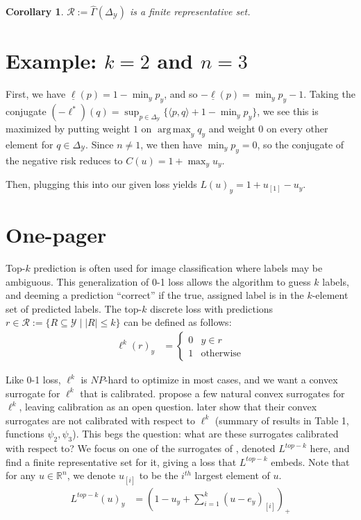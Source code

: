 \documentclass[12pt]{article}
\newcommand{\reals}{\mathbb{R}}
\newcommand{\simplex}{\Delta_\Y}
\newcommand{\R}{\mathcal{R}}
\newcommand{\Y}{\mathcal{Y}}
\newcommand{\risk}[1]{\underline{#1}}
\newcommand{\inprod}[2]{\langle #1, #2 \rangle}%
\DeclareMathOperator*{\argmax}{arg\,max}
\newtheorem{corollary}{Corollary}
\begin{document}
\begin{corollary}
	$\R := \hat \Gamma(\simplex)$ is a finite representative set.
\end{corollary}



\section{Example: $k=2$ and $n=3$}
First, we have $\risk{\ell}(p) = 1 - \min_y p_y$, and so $-\risk{\ell}(p) = \min_y p_y - 1$.
Taking the conjugate $(-\ell^*)(q) = \sup_{p \in \simplex} \{\inprod p q + 1 - \min_y p_y\}$, we see this is maximized by putting weight $1$ on $\argmax_y q_y$ and weight $0$ on every other element for $q \in \simplex$.
Since $n \neq 1$, we then have $\min_y p_y = 0$, so the conjugate of the negative risk reduces to $C(u) = 1 + \max_y u_y$.

Then, plugging this into our given loss yields $L(u)_y = 1 + u_{[1]} - u_y$.


\section{One-pager}
Top-$k$ prediction is often used for image classification where labels may be ambiguous.
This generalization of 0-1 loss allows the algorithm to guess $k$ labels, and deeming a prediction ``correct'' if the true, assigned label is in the $k$-element set of predicted labels.
The top-$k$ discrete loss with predictions $r \in \R := \{R \subseteq \Y \mid |R| \leq k\}$ can be defined as follows:
\begin{align*}
\ell^k(r)_y &=
\begin{cases}
0 & y \in r \\
1 & \text{otherwise}
\end{cases}
\end{align*}

Like 0-1 loss, $\ell^k$ is $NP$-hard to optimize in most cases, and we want a convex surrogate for $\ell^k$ that is calibrated.
\citet{lapin2015top, lapin2015loss} propose a few natural convex surrogates for $\ell^k$, leaving calibration as an open question.
\citet{yang2020consistency} later show that their convex surrogates are not calibrated with respect to $\ell^k$ (summary of results in Table 1, functions $\psi_2, \psi_3$).
This begs the question: what are these surrogates calibrated with respect to?
We focus on one of the surrogates of \citet{lapin2015top,lapin2015loss}, denoted $L^{top-k}$ here, and find a finite representative set for it, giving a loss that $L^{top-k}$ embeds.
Note that for any $u \in \reals^n$, we denote $u_{[i]}$ to be the $i^{th}$ largest element of $u$.
\begin{align*}
L^{top-k}(u)_y &= \left(1 - u_y + \sum_{i=1}^k(u-e_y)_{[i]}\right)_+
\end{align*}
\end{document}
